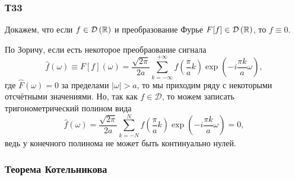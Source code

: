 \subsubsection*{Т33}

Докажем, что если $f \in \mathcal D\left(\mathbb{R}\right)$ и преобразование Фурье $F[f] \in \mathcal D\left(\mathbb{R}\right)$, то $f \equiv 0$. 


По Зоричу, если есть некоторое преобраование сигнала
\begin{equation*}
    \hat{f} (\omega) \equiv F[f] (\omega) = \frac{\sqrt{2\pi}}{2a} \sum_{k=-\infty}^{+\infty} f\left(\frac{\pi}{a}k\right) \exp\left(-i \frac{\pi k}{a} \omega\right),
\end{equation*}
где $\hat{F}(\omega) = 0$ за пределами $|\omega| > a$, то мы приходим ряду с некоторыми отсчётными значениями. Но, так как $f \in \mathcal D$, то можем записать тригонометрический полином вида
\begin{equation*}
    \hat{f} (\omega) = \frac{\sqrt{2\pi}}{2a} \sum_{k=-N}^{N} f\left(\frac{\pi}{a}k\right) \exp\left(
        -i \frac{\pi k}{a} \omega
    \right) = 0,
\end{equation*}
ведь у конечного полинома не может быть континуально нулей. 


\subsubsection*{Теорема Котельникова}

